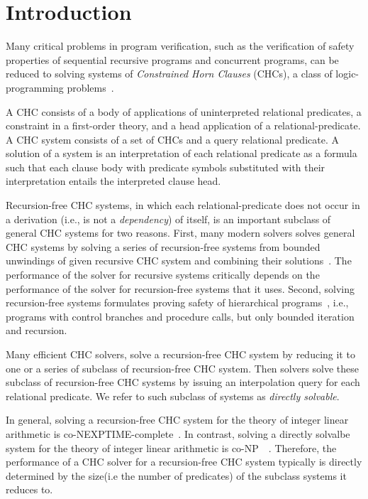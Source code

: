 \section{Introduction}
\label{sec:intro}
Many critical problems in program verification, such as the
verification of safety properties of sequential recursive programs and
concurrent programs, can be reduced to solving systems of
\emph{Constrained Horn Clauses} (CHCs), a class of logic-programming
problems~\cite{bjorner13,flanagan03,rummer13a,rummer13b}.


A CHC consists of a body of applications of uninterpreted relational
predicates, a constraint in a first-order theory, and a head
application of a relational-predicate.
%
A CHC system consists of a set of CHCs and a query relational
predicate.
% 
A solution of a system is an interpretation of each relational
predicate as a formula such that each clause body with predicate
symbols substituted with their interpretation entails the interpreted
clause head.

Recursion-free CHC systems, in which each
relational-predicate does not occur in a derivation (i.e., is not
a \emph{dependency}) of itself, is an important subclass of general
CHC systems for two reasons.
%
First, many modern solvers solves general CHC systems by solving 
a series of recursion-free systems from bounded unwindings of given
recursive CHC system and combining their solutions~\cite{bjorner13}.
%
The performance of the solver for recursive systems critically depends
on the performance of the solver for recursion-free systems that it
uses. 
%
Second, solving recursion-free systems formulates proving safety of
hierarchical programs~\cite{lal-qadeer15,lal-qadeer-lahiri12}, i.e.,
programs with control branches and procedure calls, but only bounded
iteration and recursion.

Many efficient CHC solvers, solve a recursion-free CHC system 
by reducing it to one or a series of subclass of 
recursion-free CHC system.
%
Then solvers solve these subclass of recursion-free CHC systems by
issuing an interpolation query for each relational predicate.
%
We refer to such subclass of systems as \emph{directly solvable}.
%

In general, solving a recursion-free CHC system for the theory of
integer linear arithmetic is co-NEXPTIME-complete~\cite{rummer13b}.
%
In contrast, solving a directly solvalbe system for the theory of
integer linear arithmetic is co-NP~~\cite{rummer13b}.
%
Therefore, the performance of a CHC solver for a recursion-free CHC system 
typically is directly determined by the size(i.e the number of predicates) 
of the subclass systems it reduces to.

